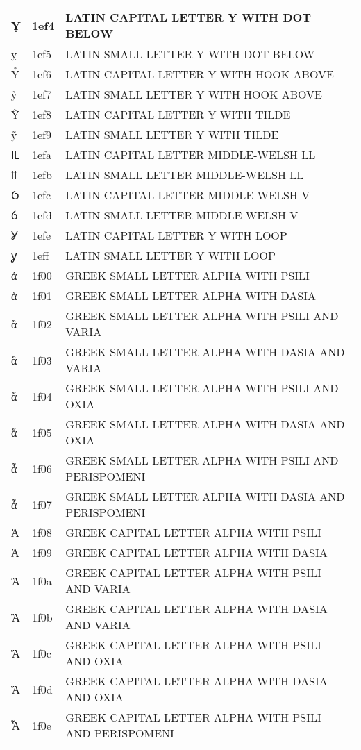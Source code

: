\documentclass[12pt,letterpaper,openany]{book}
\begin{document}
\begin{center}
\begin{supertabular}{|m{0.25in}|m{0.5in}|m{4in}|}
Ỵ & 1ef4 & LATIN CAPITAL LETTER Y WITH DOT BELOW\\\hline
ỵ & 1ef5 & LATIN SMALL LETTER Y WITH DOT BELOW\\\hline
Ỷ & 1ef6 & LATIN CAPITAL LETTER Y WITH HOOK ABOVE\\\hline
ỷ & 1ef7 & LATIN SMALL LETTER Y WITH HOOK ABOVE\\\hline
Ỹ & 1ef8 & LATIN CAPITAL LETTER Y WITH TILDE\\\hline
ỹ & 1ef9 & LATIN SMALL LETTER Y WITH TILDE\\\hline
Ỻ & 1efa & LATIN CAPITAL LETTER MIDDLE-WELSH LL\\\hline
ỻ & 1efb & LATIN SMALL LETTER MIDDLE-WELSH LL\\\hline
Ỽ & 1efc & LATIN CAPITAL LETTER MIDDLE-WELSH V\\\hline
ỽ & 1efd & LATIN SMALL LETTER MIDDLE-WELSH V\\\hline
Ỿ & 1efe & LATIN CAPITAL LETTER Y WITH LOOP\\\hline
ỿ & 1eff & LATIN SMALL LETTER Y WITH LOOP\\\hline
ἀ & 1f00 & GREEK SMALL LETTER ALPHA WITH PSILI\\\hline
ἁ & 1f01 & GREEK SMALL LETTER ALPHA WITH DASIA\\\hline
ἂ & 1f02 & GREEK SMALL LETTER ALPHA WITH PSILI AND VARIA\\\hline
ἃ & 1f03 & GREEK SMALL LETTER ALPHA WITH DASIA AND VARIA\\\hline
ἄ & 1f04 & GREEK SMALL LETTER ALPHA WITH PSILI AND OXIA\\\hline
ἅ & 1f05 & GREEK SMALL LETTER ALPHA WITH DASIA AND OXIA\\\hline
ἆ & 1f06 & GREEK SMALL LETTER ALPHA WITH PSILI AND PERISPOMENI\\\hline
ἇ & 1f07 & GREEK SMALL LETTER ALPHA WITH DASIA AND PERISPOMENI\\\hline
Ἀ & 1f08 & GREEK CAPITAL LETTER ALPHA WITH PSILI\\\hline
Ἁ & 1f09 & GREEK CAPITAL LETTER ALPHA WITH DASIA\\\hline
Ἂ & 1f0a & GREEK CAPITAL LETTER ALPHA WITH PSILI AND VARIA\\\hline
Ἃ & 1f0b & GREEK CAPITAL LETTER ALPHA WITH DASIA AND VARIA\\\hline
Ἄ & 1f0c & GREEK CAPITAL LETTER ALPHA WITH PSILI AND OXIA\\\hline
Ἅ & 1f0d & GREEK CAPITAL LETTER ALPHA WITH DASIA AND OXIA\\\hline
Ἆ & 1f0e & GREEK CAPITAL LETTER ALPHA WITH PSILI AND PERISPOMENI\\\hline

\end{supertabular}
\end{center}
\end{document}
